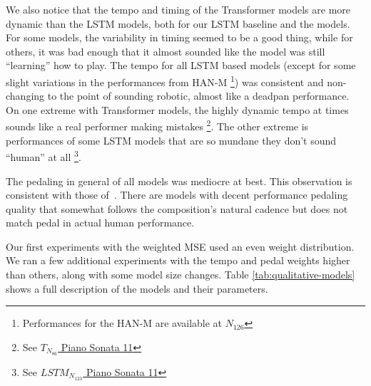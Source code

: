 \newcommand{\lm}[1]{$LSTM_{N_{#1}}$}

We also notice that the tempo and timing of the Transformer models are more dynamic than the LSTM models, both for our LSTM baseline and the \vnet{} models. For some models, the variability in timing seemed to be a good thing, while for others, it was bad enough that it almost sounded like the model was still ``learning'' how to play. The tempo for all LSTM based models (except for some slight variations in the performances from HAN-M \footnote{Performances for the HAN-M are available at \href{https://ui.neptune.ai/richt3211/thesis/e/THESIS-162/artifacts}{$N_{126}$}}) was consistent and non-changing to the point of sounding robotic, almost like a deadpan performance. On one extreme with Transformer models, the highly dynamic tempo at times sounds like a real performer making mistakes \footnote{See \href{https://ui.neptune.ai/richt3211/thesis/e/THESIS-86/artifacts}{$T_{N_{86}}$ Piano Sonata 11}}. The other extreme is performances of some LSTM models that are so mundane they don't sound ``human'' at all \footnote{See \href{https://ui.neptune.ai/richt3211/thesis/e/THESIS-123/artifacts}{\lm{123} Piano Sonata 11}}. 

The pedaling in general of all models was mediocre at best. This observation is consistent with those of~\citet{jeong2019virtuosonet}. There are models with decent performance pedaling quality that somewhat follows the composition's natural cadence but does not match pedal in actual human performance. 

Our first experiments with the weighted MSE used an even weight distribution. We ran a few additional experiments with the tempo and pedal weights higher than others, along with some model size changes. Table \ref{tab:qualitative-models} shows a full description of the models and their parameters.

\newcommand{\am}{$AM$}

